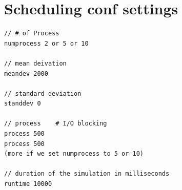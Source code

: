 \section{Scheduling conf settings}
\begin{lstlisting}
// # of Process	
numprocess 2 or 5 or 10

// mean deivation
meandev 2000

// standard deviation
standdev 0

// process    # I/O blocking
process 500
process 500
(more if we set numprocess to 5 or 10)

// duration of the simulation in milliseconds
runtime 10000

\end{lstlisting}

